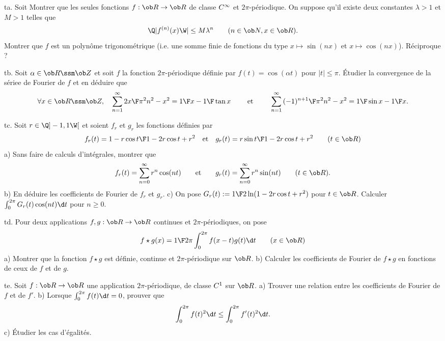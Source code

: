 \exo [Level=2,Fight=0,Learn=0,Type=\Exercices,Field=\SériesDeFourier,Origin=] ta. 
Soit Montrer que les seules fonctions $f:\ob R\to\ob R$ de classe $\sc C^\infty$ 
et $2\pi$-périodique. On suppose qu'il existe deux constantes $\lambda>1$ et $M>1$ telles que 
$$
\Q|f^{(n)}(x)\W|\le M\lambda^n\qquad(n\in\ob N, x\in\ob R). 
$$
Montrer que $f$ est un polynôme trigonométrique 
(i.e. une somme finie de fonctions du type $x\mapsto\sin(nx)$ et $x\mapsto\cos(nx)$). Réciproque ?

\exo [Level=2,Fight=0,Learn=0,Type=\Exercices,Field=\SériesDeFourier,Origin=] tb. 
Soit $\alpha\in\ob R\ssm\ob Z$ et soit $f$ la fonction $2\pi$-périodique 
définie par $f(t)=\cos(\alpha t)$ pour $|t|\le\pi$. 
\'Etudier la convergence de la sériee de Fourier de $f$ et en déduire que 
$$
\forall x\in\ob R\ssm\ob Z, \quad \sum_{n=1}^\infty{2x\F\pi^2n^2-x^2}={1\F x}-{1\F\tan x} \qquad\hbox{ et }
\qquad \sum_{n=1}^\infty{(-1)^{n+1}\F\pi^2n^2-x^2}={1\F\sin x}-{1\F x}. 
$$

\exo [Level=2,Fight=0,Learn=0,Type=\Exercices,Field=\SériesDeFourier,Origin=] tc. 
Soit $r\in\Q]-1,1\W[$ et soient $f_r$ et $g_r$ les fonctions définies par 
$$
f_r(t)={1-r\cos t\F 1-2r\cos t+r^2}\quad\hbox{et}\quad g_r(t)={r\sin t\F 1-2r\cos t+r^2}\qquad(t\in\ob R)
$$
a) Sans faire de calculs d'intégrales, montrer que 
$$
f_r(t)=\sum_{n=0}^\infty r^n\cos(nt)\qquad\hbox{et}\qquad g_r(t)=\sum_{n=0}^\infty r^n\sin(nt)\qquad(t\in\ob R). 
$$
b) En déduire les coefficients de Fourier de $f_r$ et $g_r$. \pn
c) On pose $G_r(t):={1\F2}\ln(1-2r\cos t+r^2)$ pour $t\in\ob R$. Calculer $\int_0^{2\pi}G_r(t)\cos(nt)\d t$ pour $n\ge 0$. 


\exo [Level=2,Fight=1,Learn=0,Type=\Exercices,Field=\SériesDeFourier,Origin=] td. 
Pour deux applications $f,g:\ob R\to\ob R$ continues et $2\pi$-périodiques, on pose 
$$
f\star g(x)={1\F2\pi}\int_0^{2\pi}f(x-t)g(t)\d t\qquad(x\in\ob R)
$$
a) Montrer que la fonction $f\star g$ est définie, 
continue et $2\pi$-périodique sur $\ob R$.  \pn
b) Calculer les coefficients de Fourier de $f\star g$ en fonctions de ceux de $f$ et de $g$. \pn


\exo [Level=2,Fight=1,Learn=2,Type=\Exercices,Field=\SériesDeFourier,Origin=] te. 
Soit $f:\ob R\to\ob R$ une application $2\pi$-périodique, 
de classe $\sc C^1$ sur $\ob R$. \pn
a) Trouver une relation entre les coefficients de Fourier de $f$ et de $f'$. \pn
b) Lorsque $\int_0^{2\pi}f(t)\d t=0$, prouver que 
$$
\int_0^{2\pi}f(t)^2\d t\le \int_0^{2\pi}f'(t)^2\d t. 
$$
c) \'Etudier les cas d'égalités. 


